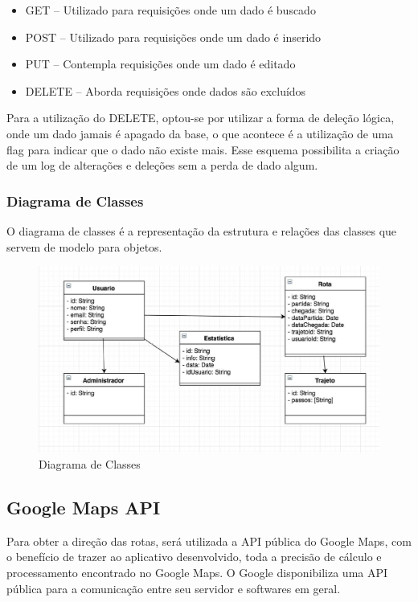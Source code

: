 \begin{itemize}
\item GET – Utilizado para requisições onde um dado é buscado
\item POST – Utilizado para requisições onde um dado é inserido
\item PUT – Contempla requisições onde um dado é editado
\item DELETE – Aborda requisições onde dados são excluídos

\end{itemize}
	
	Para a utilização do DELETE, optou-se por utilizar a forma de deleção lógica, onde um dado jamais é apagado da base, o que acontece é a utilização de uma flag para indicar que o dado não existe mais. Esse esquema possibilita a criação de um log de alterações e deleções sem a perda de dado algum.
	
\subsubsection{Diagrama de Classes}
O diagrama de classes é a representação da estrutura e relações das classes que servem de modelo para objetos.


\begin{figure}[!htb]
	\centering
	\includegraphics[scale=0.50]{arquitetura_bike.jpg}
	\caption{Diagrama de Classes}
	\label{img:diagramaclasse}
\end{figure}

\subsection{Google Maps API}
Para obter a direção das rotas, será utilizada a API pública do Google Maps, com o benefício de trazer ao aplicativo desenvolvido, toda a precisão de cálculo e processamento encontrado no Google Maps.
O Google disponibiliza uma API pública para a comunicação entre seu servidor e  softwares em geral.

